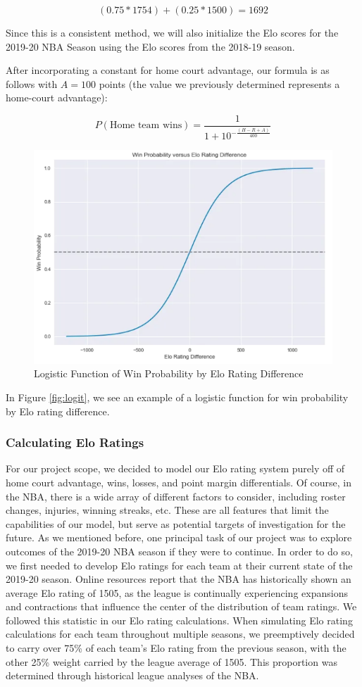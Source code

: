\documentclass[]{article}
\begin{document}
\[
(0.75 * 1754) + (0.25 * 1500) = 1692
\]

Since this is a consistent method, we will also initialize the Elo
scores for the 2019-20 NBA Season using the Elo scores from the 2018-19
season.

After incorporating a constant for home court advantage, our formula is
as follows with \(A=100\) points (the value we previously determined
represents a home-court advantage):

\[
P(\mbox{Home team wins}) = \frac{1}{1 + 10^{-\frac{(H-R+A)}{400}}}
\]

\begin{figure}[H]

{\centering \includegraphics[width=.49\linewidth]{./logistic} 

}

\caption{\label{fig:logit}Logistic Function of Win Probability by Elo Rating Difference}\label{fig:elo_logit}
\end{figure}

In Figure \ref{fig:logit}, we see an example of a logistic function for
win probability by Elo rating difference.

\hypertarget{calculating-elo-ratings}{%
\subsubsection{Calculating Elo Ratings}\label{calculating-elo-ratings}}

For our project scope, we decided to model our Elo rating system purely
off of home court advantage, wins, losses, and point margin
differentials. Of course, in the NBA, there is a wide array of different
factors to consider, including roster changes, injuries, winning
streaks, etc. These are all features that limit the capabilities of our
model, but serve as potential targets of investigation for the future.
As we mentioned before, one principal task of our project was to explore
outcomes of the 2019-20 NBA season if they were to continue. In order to
do so, we first needed to develop Elo ratings for each team at their
current state of the 2019-20 season. Online resources report that the
NBA has historically shown an average Elo rating of 1505, as the league
is continually experiencing expansions and contractions that influence
the center of the distribution of team ratings. We followed this
statistic in our Elo rating calculations. When simulating Elo rating
calculations for each team throughout multiple seasons, we preemptively
decided to carry over 75\% of each team's Elo rating from the previous
season, with the other 25\% weight carried by the league average of
1505. This proportion was determined through historical league analyses
of the NBA.
\end{document}
